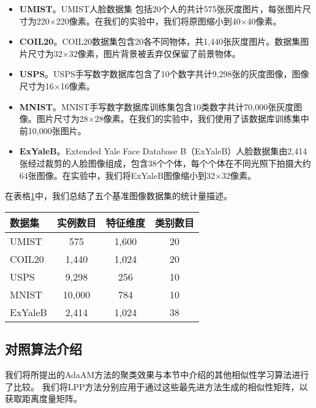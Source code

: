 \begin{itemize}
	\item {\textbf{UMIST}}。UMIST人脸数据集 \cite{graham1998characterising}包括20个人的共计575张灰度图片，每张图片尺寸为220$ \times $220像素。在我们的实验中，我们将原图缩小到40$ \times $40像素。
	\item {\textbf{COIL20}}。COIL20数据集\cite{nene1996columbia}包含20各不同物体，共1,440张灰度图片。数据集图片尺寸为32$\times$32像素，图片背景被丢弃仅保留了前景物体。
	\item {\textbf{USPS}}。USPS手写数字数据库\cite{hull1994database}包含了10个数字共计9,298张的灰度图像，图像尺寸为16$\times$16像素。
	\item {\textbf{MNIST}}。MNIST手写数字数据库\cite{lecun1998gradient}训练集包含10类数字共计70,000张灰度图像。图片尺寸为28$\times$28像素。在我们的实验中，我们使用了该数据库训练集中前10,000张图片。
	\item {\textbf{ExYaleB}}。Extended Yale Face Database B（ExYaleB）人脸数据集\cite{KCLee05}由2,414张经过裁剪的人脸图像组成，包含38个个体，每个个体在不同光照下拍摄大约64张图像。在实验中，我们将ExYaleB图像缩小到32$ \times $32像素。
\end{itemize}

在表格\ref{tab2:Data}中，我们总结了五个基准图像数据集的统计量描述。

\begin{table}[!htbp]
	\label{tab2:Data}
	\centering
	\begin{tabular}{l c c c}
		\toprule
		数据集 & 实例数目 & 特征维度 & 类别数目\\ 
		\midrule
		UMIST & 575 & 1,600 & 20\\
		COIL20 & 1,440 & 1,024 & 20\\
		USPS & 9,298 & 256 & 10\\
		MNIST & 10,000 & 784 & 10\\
		ExYaleB & 2,414 & 1,024 & 38\\
		\bottomrule
	\end{tabular}
\end{table}

\subsection{对照算法介绍}
我们将所提出的AdaAM方法的聚类效果与本节中介绍的其他相似性学习算法进行了比较。 我们将LPP方法分别应用于通过这些最先进方法生成的相似性矩阵，以获取距离度量矩阵。

